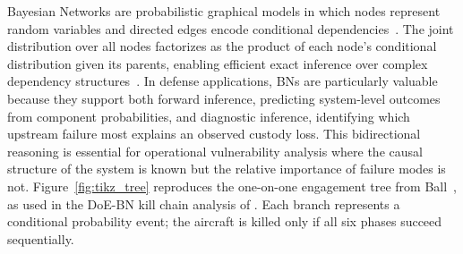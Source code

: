 \documentclass[]{spie}
\begin{document}
Bayesian Networks are probabilistic graphical models in which nodes represent random variables and directed edges encode conditional dependencies~\cite{Pearl1988}. The joint distribution over all nodes factorizes as the product of each node's conditional distribution given its parents, enabling efficient exact inference over complex dependency structures~\cite{Koller2009}. In defense applications, BNs are particularly valuable because they support both forward inference, predicting system-level outcomes from component probabilities, and diagnostic inference, identifying which upstream failure most explains an observed custody loss. This bidirectional reasoning is essential for operational vulnerability analysis where the causal structure of the system is known but the relative importance of failure modes is not. Figure~\ref{fig:tikz_tree} reproduces the one-on-one engagement tree from Ball~\cite{Ball2003}, as used in the DoE-BN kill chain analysis of \cite{Saeed2025DOEFramework,Saeed2025BNDOE}. Each branch represents a conditional probability event; the aircraft is killed only if all six phases succeed sequentially.
\end{document}
